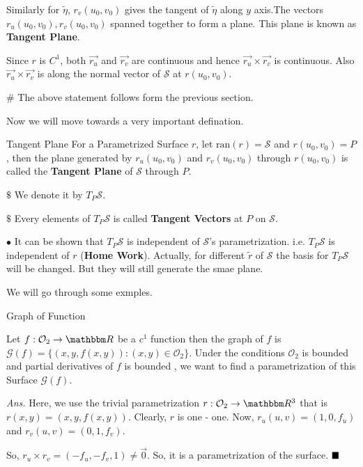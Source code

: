 \documentclass[../Analysis-3]{subfiles}
\begin{document}
\vspace{0.2cm}

Similarly for $\tilde{\eta}$, $r_v(u_0,v_0)$  gives the tangent of $\tilde{\eta}$ along $y$ axis.The vectors $r_u(u_0,v_0),r_v(u_0,v_0)$ spanned together to form a plane. This plane is known as \textbf{Tangent Plane}.

\vspace{0.2cm}

Since $r$ is $C^1$, both $\vec{r_u}$ and $\vec{r_v}$ are continuous and hence $\vec{r_u} \times \vec{r_v}$ is continuous. Also $\vec{r_u} \times \vec{r_v}$ is along the normal vector of $\mathcal{S}$ at $r(u_0,v_0)$.

\vspace{0.2cm}

$\#$ The above statement follows form the previous section.

Now we will move towards a very important defination.

\begin{Def}{Tangent Plane}{}
    For a Parametrized Surface $r$, let $\text{ran}(r)=\mathcal{S}$ and $r(u_0,v_0)=P$, then the plane generated by $r_u(u_0,v_0)$ and $r_v(u_0,v_0)$ through $r(u_0,v_0)$ is called the \textbf{Tangent Plane} of $\mathcal{S}$ through $P$.

    \vspace{0.2cm}

    $\$$ We denote it by $T_P\mathcal{S}$.

    $\$$ Every elements of $T_P\mathcal{S}$ is called \textbf{Tangent Vectors} at $P$ on $\mathcal{S}$.
\end{Def}

$\bullet$ It can be shown that $T_P\mathcal{S}$ is independent of $\mathcal{S}$'s parametrization. i.e. $T_P\mathcal{S}$ is independent of $r$ (\textbf{Home Work}). Actually, for different $\tilde{r}$ of $\mathcal{S}$ the basis for $T_P\mathcal{S}$ will be changed. But they will still generate the smae plane.

\vspace{0.2cm}

We will go through some exmples.

\begin{Eg}{Graph of Function}{}\label{eg:grp}

    Let $f : \mathcal{O}_2 \to \R$ be a $c^1$ function then the graph of $f$ is $\mathcal{G}(f) = \{ (x,y,f(x,y)) : (x,y)\in \mathcal{O}_2\}$. Under the conditions $\mathcal{O}_2$ is bounded and partial derivatives of $f$ is bounded , we want to find a parametrization of this Surface $\mathcal{G}(f)$.

    \vspace{0.2cm}

    \textit{Ans.} Here, we use the trivial parametrization $r : \mathcal{O}_2 \to \R^3$ that is $ r(x,y) = (x,y,f(x,y))$. Clearly, $r$ is one - one. Now, $r_u(u,v) = (1,0,f_u)$ and $r_v(u,v) = (0,1,f_v)$.

    \vspace{0.2cm}

    So, $ r_u \times r_v = (-f_u,-f_v,1) \neq \vec{0}$. So, it is a parametrization of the surface. $\hfill \blacksquare$
\end{Eg}
\end{document}
